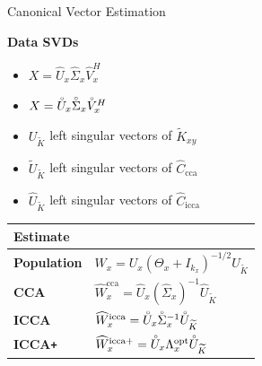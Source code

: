 \documentclass[8pt]{beamer}
\newcommand{\Ux}{U_x}
\newcommand{\kx}{k_x}
\newcommand{\Uxhat}{\widehat{U}_x}
\newcommand{\Sigxhat}{\widehat{\Sigma}_x}
\newcommand{\Vxhat}{\widehat{V}_x}
\newcommand{\Uxcir}{\accentset{\circ}{U}_x}
\newcommand{\Ukcir}{\accentset{\circ}{U}_{\widetilde{K}}}
\newcommand{\Sigxcir}{\accentset{\circ}{\Sigma}_x}
\newcommand{\Vxcir}{\accentset{\circ}{V}_x}
\newcommand{\Tx}{\Theta_x}
\newcommand{\Kxytil}{\widetilde{K}_{xy}}
\newcommand{\Uktil}{U_{\widetilde{K}}}
\newcommand{\Uktilhat}{\widehat{U}_{\widetilde{K}}}
\newcommand{\Cccahat}{\widehat{C}_{\text{cca}}}
\newcommand{\Ciccahat}{\widehat{C}_{\text{icca}}}
\newcommand{\iccap}{ICCA\texttt{+} }
\begin{document}
\begin{frame}{Canonical Vector Estimation}

\textbf{Data SVDs}
\begin{itemize}
\item $X=\Uxhat\Sigxhat\Vxhat^H$
\item $X=\Uxcir\Sigxcir\Vxcir^H$
\item $\Uktil$ left singular vectors of $\Kxytil$
\item $\widetilde{U}_{\widetilde{K}}$ left singular vectors of $\Cccahat$
\item $\Uktilhat$ left singular vectors of $\Ciccahat$
\end{itemize}

\vspace{3ex}

\begin{table}[t]
\centering
\begin{tabular}{l|l}\toprule
Estimate & \\
\midrule
\textbf{Population}  & $W_x = \Ux\left(\Tx + I_{\kx}\right)^{-1/2}\Uktil$\\[1ex]
\textbf{CCA} & $\widehat{W}_x^{\text{cca}} =
\Uxhat\left(\Sigxhat\right)^{-1}\widehat{U}_{\widetilde{K}}$\\[1ex]
\textbf{ICCA} & $\widehat{W}_x^{\text{icca}} = \Uxcir\Sigxcir^{-1}\Ukcir$\\[1ex]
\textbf{\iccap} &$\widehat{W}_x^{\text{icca+}} = \Uxcir\Lambda_x^{\text{opt}}\Ukcir$\\[1ex]
\bottomrule
\end{tabular}
\end{table}

\end{frame}
\end{document}
